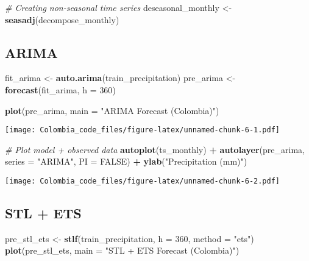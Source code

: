\documentclass[
]{article}
\newenvironment{Shaded}{\begin{snugshade}}{\end{snugshade}}
\newcommand{\AttributeTok}[1]{\textcolor[rgb]{0.13,0.29,0.53}{#1}}
\newcommand{\CommentTok}[1]{\textcolor[rgb]{0.56,0.35,0.01}{\textit{#1}}}
\newcommand{\ConstantTok}[1]{\textcolor[rgb]{0.56,0.35,0.01}{#1}}
\newcommand{\DecValTok}[1]{\textcolor[rgb]{0.00,0.00,0.81}{#1}}
\newcommand{\FunctionTok}[1]{\textcolor[rgb]{0.13,0.29,0.53}{\textbf{#1}}}
\newcommand{\NormalTok}[1]{#1}
\newcommand{\OtherTok}[1]{\textcolor[rgb]{0.56,0.35,0.01}{#1}}
\newcommand{\SpecialCharTok}[1]{\textcolor[rgb]{0.81,0.36,0.00}{\textbf{#1}}}
\newcommand{\StringTok}[1]{\textcolor[rgb]{0.31,0.60,0.02}{#1}}
\begin{document}
\begin{Shaded}
\begin{Highlighting}[]
\CommentTok{\# Creating non{-}seasonal time series}
\NormalTok{deseasonal\_monthly }\OtherTok{\textless{}{-}} \FunctionTok{seasadj}\NormalTok{(decompose\_monthly)}
\end{Highlighting}
\end{Shaded}

\subsection{ARIMA}\label{arima}

\begin{Shaded}
\begin{Highlighting}[]
\NormalTok{fit\_arima }\OtherTok{\textless{}{-}} \FunctionTok{auto.arima}\NormalTok{(train\_precipitation)}
\NormalTok{pre\_arima }\OtherTok{\textless{}{-}} \FunctionTok{forecast}\NormalTok{(fit\_arima, }\AttributeTok{h =} \DecValTok{360}\NormalTok{)}

\FunctionTok{plot}\NormalTok{(pre\_arima, }\AttributeTok{main =} \StringTok{"ARIMA Forecast (Colombia)"}\NormalTok{)}
\end{Highlighting}
\end{Shaded}

\texttt{[image: Colombia\_code\_files/figure-latex/unnamed-chunk-6-1.pdf]}

\begin{Shaded}
\begin{Highlighting}[]
\CommentTok{\# Plot model + observed data}
\FunctionTok{autoplot}\NormalTok{(ts\_monthly) }\SpecialCharTok{+} \FunctionTok{autolayer}\NormalTok{(pre\_arima, }\AttributeTok{series =} \StringTok{"ARIMA"}\NormalTok{,}
    \AttributeTok{PI =} \ConstantTok{FALSE}\NormalTok{) }\SpecialCharTok{+} \FunctionTok{ylab}\NormalTok{(}\StringTok{"Precipitation (mm)"}\NormalTok{)}
\end{Highlighting}
\end{Shaded}

\texttt{[image: Colombia\_code\_files/figure-latex/unnamed-chunk-6-2.pdf]}

\subsection{STL + ETS}\label{stl-ets}

\begin{Shaded}
\begin{Highlighting}[]
\NormalTok{pre\_stl\_ets }\OtherTok{\textless{}{-}} \FunctionTok{stlf}\NormalTok{(train\_precipitation, }\AttributeTok{h =} \DecValTok{360}\NormalTok{, }\AttributeTok{method =} \StringTok{"ets"}\NormalTok{)}
\FunctionTok{plot}\NormalTok{(pre\_stl\_ets, }\AttributeTok{main =} \StringTok{"STL + ETS Forecast (Colombia)"}\NormalTok{)}
\end{Highlighting}
\end{Shaded}
\end{document}
